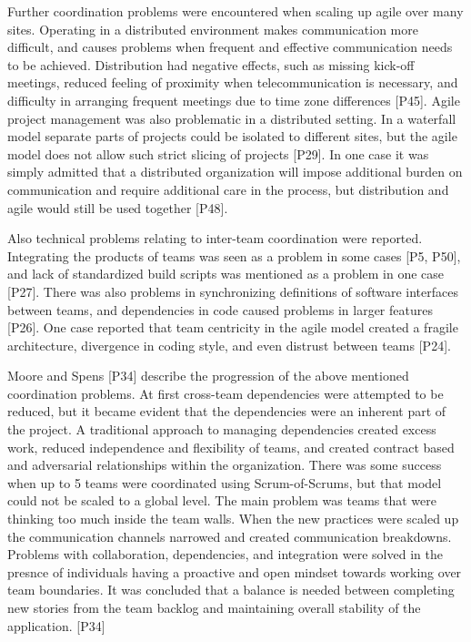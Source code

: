 \documentclass[preprint,authoryear,12pt]{elsarticle}
\begin{document}
Further coordination problems were encountered when scaling up agile over many
sites. Operating in a distributed environment makes communication more
difficult, and causes problems when frequent and effective communication needs
to be achieved. Distribution had negative effects, such as missing kick-off
meetings, reduced feeling of proximity when telecommunication is necessary, and
difficulty in arranging frequent meetings due to time zone differences [P45].
Agile project management was also problematic in a distributed setting. In a
waterfall model separate parts of projects could be isolated to different sites,
but the agile model does not allow such strict slicing of projects [P29]. In one
case it was simply admitted that a distributed organization will impose
additional burden on communication and require additional care in the process,
but distribution and agile would still be used together [P48].

Also technical problems relating to inter-team coordination were reported.
Integrating the products of teams was seen as a problem in some cases [P5, P50],
and lack of standardized build scripts was mentioned as a problem in one case
[P27]. There was also problems in synchronizing definitions of software
interfaces between teams, and dependencies in code caused problems in larger
features [P26]. One case reported that team centricity in the agile model
created a fragile architecture, divergence in coding style, and even distrust
between teams [P24].

Moore and Spens [P34] describe the progression of the above mentioned
coordination problems. At first cross-team dependencies were attempted to be
reduced, but it became evident that the dependencies were an inherent part of
the project. A traditional approach to managing dependencies created excess
work, reduced independence and flexibility of teams, and created contract based
and adversarial relationships within the organization. There was some success
when up to 5 teams were coordinated using Scrum-of-Scrums, but that model could
not be scaled to a global level. The main problem was teams that were thinking
too much inside the team walls. When the new practices were scaled up the
communication channels narrowed and created communication breakdowns. Problems
with collaboration, dependencies, and integration were solved in the presnce of
individuals having a proactive and open mindset towards working over team
boundaries. It was concluded that a balance is needed between completing new
stories from the team backlog and maintaining overall stability of the
application. [P34]
\end{document}
